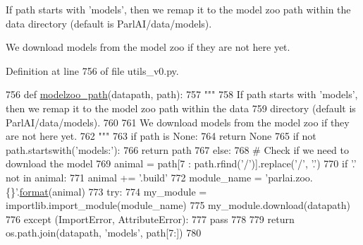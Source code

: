 \begin{DoxyVerb}If path starts with 'models', then we remap it to the model zoo path within the data
directory (default is ParlAI/data/models).

We download models from the model zoo if they are not here yet.
\end{DoxyVerb}
 

Definition at line 756 of file utils\+\_\+v0.\+py.


\begin{DoxyCode}
756 \textcolor{keyword}{def }\hyperlink{namespaceparlai_1_1agents_1_1legacy__agents_1_1seq2seq_1_1utils__v0_a5fbd3301b67f00d6d146fb01c7cd7626}{modelzoo\_path}(datapath, path):
757     \textcolor{stringliteral}{"""}
758 \textcolor{stringliteral}{    If path starts with 'models', then we remap it to the model zoo path within the data}
759 \textcolor{stringliteral}{    directory (default is ParlAI/data/models).}
760 \textcolor{stringliteral}{}
761 \textcolor{stringliteral}{    We download models from the model zoo if they are not here yet.}
762 \textcolor{stringliteral}{    """}
763     \textcolor{keywordflow}{if} path \textcolor{keywordflow}{is} \textcolor{keywordtype}{None}:
764         \textcolor{keywordflow}{return} \textcolor{keywordtype}{None}
765     \textcolor{keywordflow}{if} \textcolor{keywordflow}{not} path.startswith(\textcolor{stringliteral}{'models:'}):
766         \textcolor{keywordflow}{return} path
767     \textcolor{keywordflow}{else}:
768         \textcolor{comment}{# Check if we need to download the model}
769         animal = path[7 : path.rfind(\textcolor{stringliteral}{'/'})].replace(\textcolor{stringliteral}{'/'}, \textcolor{stringliteral}{'.'})
770         \textcolor{keywordflow}{if} \textcolor{stringliteral}{'.'} \textcolor{keywordflow}{not} \textcolor{keywordflow}{in} animal:
771             animal += \textcolor{stringliteral}{'.build'}
772         module\_name = \textcolor{stringliteral}{'parlai.zoo.\{\}'}.\hyperlink{namespaceparlai_1_1chat__service_1_1services_1_1messenger_1_1shared__utils_a32e2e2022b824fbaf80c747160b52a76}{format}(animal)
773         \textcolor{keywordflow}{try}:
774             my\_module = importlib.import\_module(module\_name)
775             my\_module.download(datapath)
776         \textcolor{keywordflow}{except} (ImportError, AttributeError):
777             \textcolor{keywordflow}{pass}
778 
779         \textcolor{keywordflow}{return} os.path.join(datapath, \textcolor{stringliteral}{'models'}, path[7:])
780 \end{DoxyCode}
\mbox{\label{namespaceparlai_1_1agents_1_1legacy__agents_1_1seq2seq_1_1utils__v0_af377ec61bfc0423461e7b409ffc883b9}} 
